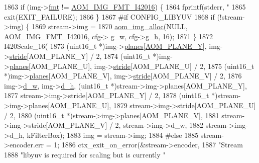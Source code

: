 \begin{DoxyCodeInclude}
{{{{{{{{{{{{{{{{{{{{{{{{{{{{{{{{1863       \textcolor{keywordflow}{if} (img->\hyperlink{structaom__image_a6c64b1ab918d80d52eb8f5d6d957e825}{fmt} != \hyperlink{aom__image_8h_a930317c04b4bd0a660bb5e744055523ca20a9cf30277260685642b4cfb4e9273b}{AOM\_IMG\_FMT\_I42016}) \{
1864         fprintf(stderr, \textcolor{stringliteral}{"%
1865         exit(EXIT\_FAILURE);
1866       \}
1867 \textcolor{preprocessor}{#if CONFIG\_LIBYUV}
1868       \textcolor{keywordflow}{if} (!stream->img) \{
1869         stream->img =
1870             \hyperlink{aom__image_8h_a570db29fbd122951235a08fe9375f6bb}{aom\_img\_alloc}(NULL, \hyperlink{aom__image_8h_a930317c04b4bd0a660bb5e744055523ca20a9cf30277260685642b4cfb4e9273b}{AOM\_IMG\_FMT\_I42016}, cfg->
      \hyperlink{structaom__codec__enc__cfg_a80cb459c5ef3c7e1516f617c4c9d6eab}{g\_w}, cfg->\hyperlink{structaom__codec__enc__cfg_a37b0f57b63bec8d133df8901d4407ee6}{g\_h}, 16);
1871       \}
1872       I420Scale\_16(
1873           (uint16\_t *)img->\hyperlink{structaom__image_ac54dbc5237ca2914f9ec30105dfbe302}{planes}[\hyperlink{aom__image_8h_a2ad22076006b15cf809edcaa33f6d339}{AOM\_PLANE\_Y}], img->\hyperlink{structaom__image_a6dc693d7dbc9eb06c0cdde307ca58372}{stride}[AOM\_PLANE\_Y] / 2,
1874           (uint16\_t *)img->\hyperlink{structaom__image_ac54dbc5237ca2914f9ec30105dfbe302}{planes}[AOM\_PLANE\_U], img->\hyperlink{structaom__image_a6dc693d7dbc9eb06c0cdde307ca58372}{stride}[AOM\_PLANE\_U] / 2,
1875           (uint16\_t *)img->\hyperlink{structaom__image_ac54dbc5237ca2914f9ec30105dfbe302}{planes}[AOM\_PLANE\_V], img->\hyperlink{structaom__image_a6dc693d7dbc9eb06c0cdde307ca58372}{stride}[AOM\_PLANE\_V] / 2,
1876           img->\hyperlink{structaom__image_a89f80b1f58d608b9d2080635f4359034}{d\_w}, img->\hyperlink{structaom__image_ab986419a1f0fff93a2dc505f47194988}{d\_h}, (uint16\_t *)stream->img->planes[AOM\_PLANE\_Y],
1877           stream->img->stride[AOM\_PLANE\_Y] / 2,
1878           (uint16\_t *)stream->img->planes[AOM\_PLANE\_U],
1879           stream->img->stride[AOM\_PLANE\_U] / 2,
1880           (uint16\_t *)stream->img->planes[AOM\_PLANE\_V],
1881           stream->img->stride[AOM\_PLANE\_V] / 2, stream->img->d\_w,
1882           stream->img->d\_h, kFilterBox);
1883       img = stream->img;
1884 \textcolor{preprocessor}{#else}
1885       stream->encoder.err = 1;
1886       ctx\_exit\_on\_error(&stream->encoder,
1887                         \textcolor{stringliteral}{"Stream %
1888                         \textcolor{stringliteral}{"libyuv is required for scaling but is currently "}
}}}}}}}}}}}}}}}}}}}}}}}}}}}}}}}}}}
\end{DoxyCodeInclude}

